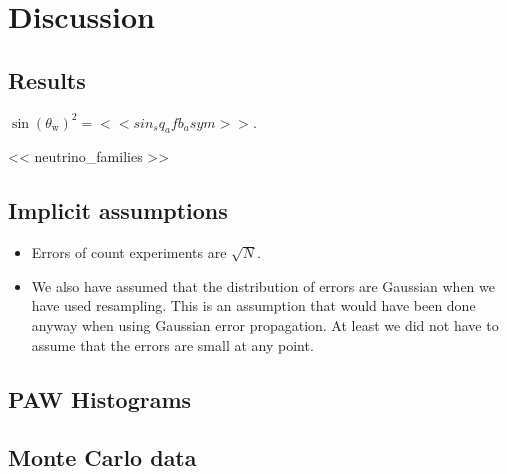 \documentclass[11pt, english, fleqn, DIV=15, headinclude, BCOR=2cm]{scrreprt}
\begin{document}
\chapter{Discussion}

\section{Results}

$\sin(\theta_\mathrm w)^2 = << sin_sq_afb_asym >>$.

\num{<< neutrino_families >>}

\section{Implicit assumptions}


\begin{itemize}
    \item
        Errors of count experiments are $\sqrt N$.

    \item
        We also have assumed that the distribution of errors are Gaussian when
        we have used resampling. This is an assumption that would have been
        done anyway when using Gaussian error propagation. At least we did not
        have to assume that the errors are small at any point.
\end{itemize}

\begin{appendix}

    \chapter{PAW Histograms}

    \section{Monte Carlo data}

    

    

    
    
    

\end{appendix}
\end{document}
